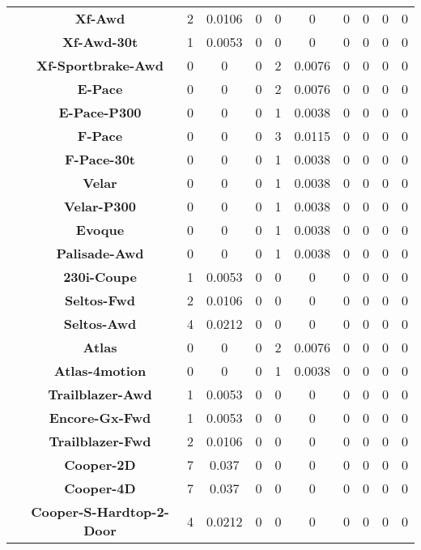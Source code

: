 \begin{center}
\begin{tabular}{|c|c||@{\hspace{1ex}}||c|c|c||@{\hspace{1ex}}||c|c|c||@{\hspace{1ex}}||c|c|c||@{\hspace{1ex}}||}
\cline{2-11}
  & {\bf Xf-Awd} & 2 & 0.0106 & 0 & 0 & 0 & 0 & 0 & 0 & 0 \\
\cline{2-11}
  & {\bf Xf-Awd-30t} & 1 & 0.0053 & 0 & 0 & 0 & 0 & 0 & 0 & 0 \\
\cline{2-11}
  & {\bf Xf-Sportbrake-Awd} & 0 & 0 & 0 & 2 & 0.0076 & 0 & 0 & 0 & 0 \\
\cline{2-11}
  & {\bf E-Pace} & 0 & 0 & 0 & 2 & 0.0076 & 0 & 0 & 0 & 0 \\
\cline{2-11}
  & {\bf E-Pace-P300} & 0 & 0 & 0 & 1 & 0.0038 & 0 & 0 & 0 & 0 \\
\cline{2-11}
  & {\bf F-Pace} & 0 & 0 & 0 & 3 & 0.0115 & 0 & 0 & 0 & 0 \\
\cline{2-11}
  & {\bf F-Pace-30t} & 0 & 0 & 0 & 1 & 0.0038 & 0 & 0 & 0 & 0 \\
\cline{2-11}
  & {\bf Velar} & 0 & 0 & 0 & 1 & 0.0038 & 0 & 0 & 0 & 0 \\
\cline{2-11}
  & {\bf Velar-P300} & 0 & 0 & 0 & 1 & 0.0038 & 0 & 0 & 0 & 0 \\
\cline{2-11}
  & {\bf Evoque} & 0 & 0 & 0 & 1 & 0.0038 & 0 & 0 & 0 & 0 \\
\cline{2-11}
  & {\bf Palisade-Awd} & 0 & 0 & 0 & 1 & 0.0038 & 0 & 0 & 0 & 0 \\
\cline{2-11}
  & {\bf 230i-Coupe} & 1 & 0.0053 & 0 & 0 & 0 & 0 & 0 & 0 & 0 \\
\cline{2-11}
  & {\bf Seltos-Fwd} & 2 & 0.0106 & 0 & 0 & 0 & 0 & 0 & 0 & 0 \\
\cline{2-11}
  & {\bf Seltos-Awd} & 4 & 0.0212 & 0 & 0 & 0 & 0 & 0 & 0 & 0 \\
\cline{2-11}
  & {\bf Atlas} & 0 & 0 & 0 & 2 & 0.0076 & 0 & 0 & 0 & 0 \\
\cline{2-11}
  & {\bf Atlas-4motion} & 0 & 0 & 0 & 1 & 0.0038 & 0 & 0 & 0 & 0 \\
\cline{2-11}
  & {\bf Trailblazer-Awd} & 1 & 0.0053 & 0 & 0 & 0 & 0 & 0 & 0 & 0 \\
\cline{2-11}
  & {\bf Encore-Gx-Fwd} & 1 & 0.0053 & 0 & 0 & 0 & 0 & 0 & 0 & 0 \\
\cline{2-11}
  & {\bf Trailblazer-Fwd} & 2 & 0.0106 & 0 & 0 & 0 & 0 & 0 & 0 & 0 \\
\cline{2-11}
  & {\bf Cooper-2D} & 7 & 0.037 & 0 & 0 & 0 & 0 & 0 & 0 & 0 \\
\cline{2-11}
  & {\bf Cooper-4D} & 7 & 0.037 & 0 & 0 & 0 & 0 & 0 & 0 & 0 \\
\cline{2-11}
  & {\bf Cooper-S-Hardtop-2-Door} & 4 & 0.0212 & 0 & 0 & 0 & 0 & 0 & 0 & 0 \\

\end{tabular}
\end{center}

